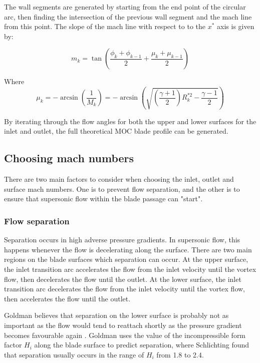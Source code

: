 The wall segments are generated by starting from the end point of the circular arc, then finding the intersection of the previous wall segment and the mach line from this point. The slope of the mach line with respect to to the $x^*$ axis is given by:

\begin{equation}
    m_k = \tan\left(\frac{\phi_k+\phi_{k-1}}{2}+\frac{\mu_k+\mu_{k-1}}{2}\right)
\end{equation}

Where
\begin{equation}
    \mu_k = -\arcsin\left(\frac{1}{M_k}\right) = -\arcsin\left(\sqrt{\left(\frac{\gamma+1}{2}\right)R^{*2}_k - \frac{\gamma-1}{2}}\right)
\end{equation}

By iterating through the flow angles for both the upper and lower surfaces for the inlet and outlet, the full theoretical MOC blade profile can be generated.


\subsection{Choosing mach numbers}

There are two main factors to consider when choosing the inlet, outlet and surface mach numbers. One is to prevent flow separation, and the other is to ensure that supersonic flow within the blade passage can "start".

\subsubsection{Flow separation}

Separation occurs in high adverse pressure gradients. In supersonic flow, this happens whenever the flow is decelerating along the surface.  There are two main regions on the blade surfaces which separation can occur. At the upper surface, the inlet transition arc accelerates the flow from the inlet velocity until the vortex flow, then decelerates the flow until the outlet. At the lower surface, the inlet transition arc decelerates the flow from the inlet velocity until the vortex flow, then accelerates the flow until the outlet. 

Goldman believes that separation on the lower surface is probably not as important as the flow would tend to reattach shortly as the pressure gradient becomes favourable again \cite{goldman1970}. Goldman uses the value of the incompressible form factor $H_i$ along the blade surface to predict separation, where  Schlichting found  that separation usually occurs in the range of $H_i$ from 1.8 to 2.4.

